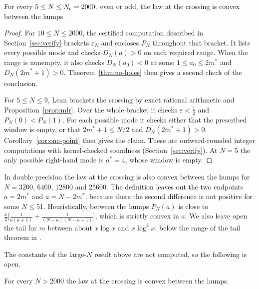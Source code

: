 \begin{proposition}\label{prop:convex-certified}
For every $5\le N\le N_{\rm c}=2000$, even or odd, the law at the crossing is
convex between the humps.
\end{proposition}

\begin{proof}
For $10\le N\le2000$, the certified computation described in
Section~\ref{sec:verify} brackets $\varepsilon_N$ and encloses $P_N$ throughout
that bracket. It lists every possible mode and checks $D_N(a)>0$ on each
required range. When the range is nonempty, it also checks
$D_N(a_0)<0$ at some $1\le a_0\le2m^*$ and $D_N(2m^*+1)>0$.
Theorem~\ref{thm:no-holes} then gives a second check of the conclusion.

For $5\le N\le9$, Lean brackets the crossing by exact rational
arithmetic and Proposition~\ref{prop:mlr}. Over the whole bracket it checks
$\varepsilon<\frac12$ and $P_N(0)<P_N(1)$. For each possible mode it
checks either that the prescribed window is empty, or that
$2m^*+1\le N/2$ and $D_N(2m^*+1)>0$.
Corollary~\ref{cor:one-point} then gives the claim. These are
outward-rounded integer computations with kernel-checked soundness
(Section~\ref{sec:verify}). At $N=5$ the only possible right-hand mode is
$a^*=4$, whose window is empty.
\end{proof}

In double precision the law at the crossing is also convex between the humps
for $N=3200$, $6400$, $12800$ and $25600$. The definition leaves out the two
endpoints $a=2m^*$ and
$a=N-2m^*$, because there the second difference is not positive for some
$N\le51$. Heuristically, between the humps $P_N(a)$ is close to
$\frac x2\bigl[\frac1{a(a+1)}+\frac1{(N-a)(N-a+1)}\bigr]$, which is strictly
convex in $a$. We also leave open the tail for $m$ between about $x\log x$
and $x\log^2x$, below the range of the tail theorem in
.

The constants of the large-$N$ result above are not computed, so the
following is open.

\begin{conjecture}\label{conj:convex}
For every $N>2000$ the law at the crossing is convex between the humps.
\end{conjecture}


